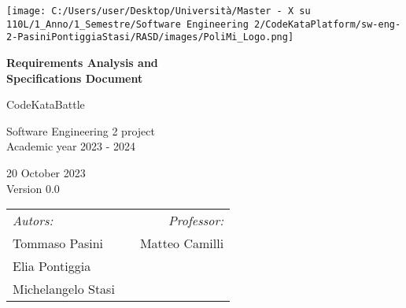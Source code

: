 \begin{titlepage}
    \begin{center}
        \texttt{[image: C:/Users/user/Desktop/Università/Master - X su 110L/1\_Anno/1\_Semestre/Software Engineering 2/CodeKataPlatform/sw-eng-2-PasiniPontiggiaStasi/RASD/images/PoliMi\_Logo.png]}

        \vspace*{1cm}
            \textbf{\huge Requirements Analysis and\\Specifications Document}
 
        \vspace{0.5cm}
            \LARGE CodeKataBattle
             
        \vspace{1.5cm}
            \normalsize Software Engineering 2 project\\
            Academic year 2023 - 2024

        \vspace{0.5cm}
            20 October 2023\\
            Version 0.0
 
        \vspace{1.5cm}
            \small
            \begin{table}[b]
                \begin{tabular}{l p{5.5cm} l}
                    \textit{Autors:}    & & \multicolumn{1}{r}{\textit{Professor:}}           \\
                    Tommaso Pasini      & & \multicolumn{1}{r}{Matteo Camilli}                \\
                    Elia Pontiggia      & & \textbf{}                                         \\
                    Michelangelo Stasi  & & \textbf{}                              
                \end{tabular}
            \end{table}
              
    \end{center}
 \end{titlepage}